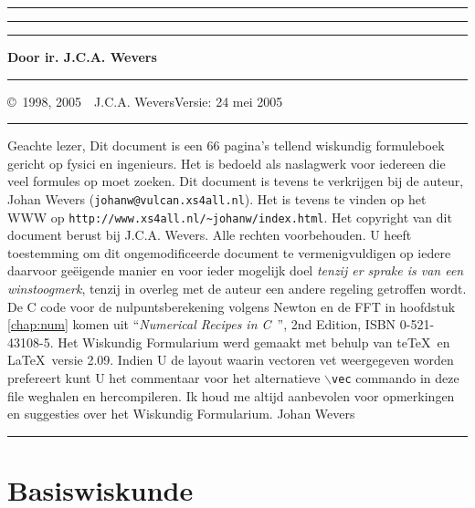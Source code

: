 \pagestyle{plain}

\thispagestyle{empty}
\hrule
\rule{.4pt}{22.35cm}\hspace*{161.62mm}\rule{.4pt}{22.35cm}
\vspace*{-17cm}
\begin{center}
\Huge
{}
\end{center}
\vspace{2cm}
\centerline{\Large\bf Door ir. J.C.A. Wevers}
\vfill
\hrule
\newpage
\thispagestyle{empty}
\copyright~1998, 2005~~J.C.A. Wevers\hfill Versie: 24 mei 2005
\npar
\hrule
\par
\bigskip
Geachte lezer,
\npar
Dit document is een 66 pagina's tellend wiskundig formuleboek gericht
op fysici en ingenieurs. Het is bedoeld als naslagwerk voor iedereen die
veel formules op moet zoeken.
\npar
Dit document is tevens te verkrijgen bij de auteur, Johan Wevers ({\tt johanw@vulcan.xs4all.nl}).
\npar
Het is tevens te vinden op het WWW op {\tt http://www.xs4all.nl/\~{}johanw/index.html}.
\npar
Het copyright van dit document berust bij J.C.A. Wevers. Alle rechten
voorbehouden. U heeft toestemming om dit ongemodificeerde document te
vermenigvuldigen op iedere daarvoor ge\"eigende manier en voor ieder mogelijk
doel {\it tenzij er sprake is van een winstoogmerk}, tenzij in overleg met de
auteur een andere regeling getroffen wordt.
\npar
De C code voor de nulpuntsberekening volgens Newton en de FFT in hoofdstuk
\ref{chap:num} komen uit ``{\it Numerical Recipes in C}~'', 2nd Edition,
ISBN 0-521-43108-5.
\npar
Het Wiskundig Formularium werd gemaakt met behulp van te\TeX\ en \LaTeX\ versie 2.09.
\npar
Indien U de layout waarin vectoren vet weergegeven worden prefereert kunt U
het commentaar voor het alternatieve {\tt $\backslash$vec} commando in deze
file weghalen en hercompileren.
\npar
Ik houd me altijd aanbevolen voor opmerkingen en suggesties over het
Wiskundig Formularium.
\npar
Johan Wevers
\vfill
\hrule

\newpage

\tableofcontents
\cleardoublepage


\renewcommand{\chaptermark}[1]{\markboth{#1}{#1}}

\chapter{Basiswiskunde}
